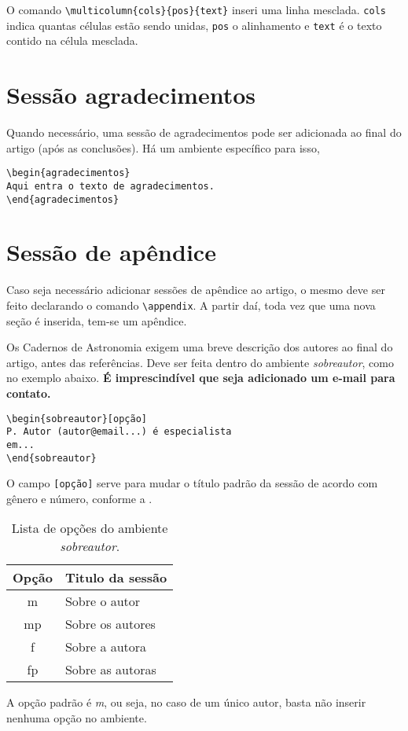 \documentclass{article}
\begin{document}
O comando \verb|\multicolumn{cols}{pos}{text}| inseri uma linha mesclada. \verb|cols| indica quantas células estão sendo unidas, \verb|pos| o alinhamento e \verb|text| é o texto contido na célula mesclada.

\section{Sessão agradecimentos}
Quando necessário, uma sessão de agradecimentos pode ser adicionada ao final do artigo (após as conclusões). Há um ambiente específico para isso,
\begin{verbatim}
\begin{agradecimentos}
Aqui entra o texto de agradecimentos.
\end{agradecimentos}
\end{verbatim}

\appendix

\section{Sessão de apêndice}
Caso seja necessário adicionar sessões de apêndice ao artigo, o mesmo deve ser feito declarando o comando \verb|\appendix|. A partir daí, toda vez que uma nova seção é inserida, tem-se um apêndice.

\begin{sobreautor}[m]
Os Cadernos de Astronomia exigem uma breve descrição dos autores ao final do artigo, antes das referências. Deve ser feita dentro do ambiente \textit{sobreautor}, como no exemplo abaixo. \textbf{É imprescindível que seja adicionado um e-mail para contato.}
\begin{verbatim}
\begin{sobreautor}[opção]
P. Autor (autor@email...) é especialista
em...
\end{sobreautor}
\end{verbatim}

O campo \verb|[opção]| serve para mudar o título padrão da sessão de acordo com gênero e número, conforme a .
\begin{table}[h!]
    \renewcommand{\arraystretch}{1.2}
	\centering
	\caption{Lista de opções do ambiente \textit{sobreautor}.}
	\label{tab:2}
	\begin{tabular}{c|l}
		\hline\hline
		Opção & Titulo da sessão \\
		\hline
		m & Sobre o autor \\
		\hline
		mp & Sobre os autores \\
		\hline
		f & Sobre a autora \\
		\hline
		fp & Sobre as autoras \\
		\hline\hline
	\end{tabular}
\end{table}

A opção padrão é \textit{m}, ou seja, no caso de um único autor, basta não inserir nenhuma opção no ambiente.
\end{sobreautor}
\end{document}
